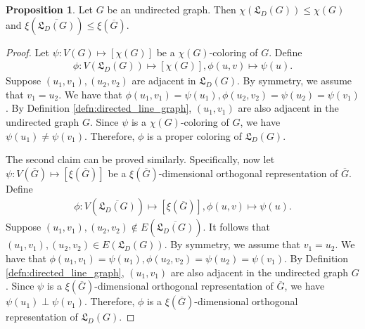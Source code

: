\documentclass[journal, onecolumn, draftcls]{IEEEtran}
\theoremstyle{definition}
\newtheorem{proposition}{Proposition}
\newcommand{\frL}{\mathfrak{L}}
\newcommand{\aditya}[1]{\marginpar{+}{\bf Aditya's remark}: {\em #1}}
\begin{document}
\begin{proposition}\label{prop:chi_and_xi_of_line_graph}
    Let $G$ be an undirected graph. Then $\chi(\frL_D(G) )\le \chi(G)$ and $\xi(\overline{\frL_D(G)}) \le \xi(\overline{G})$. 
\end{proposition}
\begin{proof}
Let $\psi:V(G) \mapsto [\chi(G)]$ be a $\chi(G)$-coloring of $G$. Define
\begin{align*}
    \phi:V(\frL_D(G)) \mapsto [\chi(G)], \phi(u,v) \mapsto \psi(u).
\end{align*}
Suppose $(u_1,v_1),(u_2,v_2)$ are adjacent in $\frL_D(G)$. By symmetry, we assume that $v_1 = u_2$. We have that $\phi(u_1,v_1)=\psi(u_1),\phi(u_2,v_2)=\psi(u_2)=\psi(v_1)$. 
By Definition \ref{defn:directed_line_graph}, $(u_1,v_1)$ are also adjacent in the undirected graph $G$. Since $\psi$ is a $\chi(G)$-coloring of $G$, we have $\psi(u_1)\ne \psi(v_1)$. Therefore, $\phi$ is a proper coloring of $\frL_D(G)$.

The second claim can be proved similarly. Specifically, now let $\psi:V(\overline{G}) \mapsto [\xi(\overline{G})]$ be a $\xi(\overline{G})$-dimensional orthogonal representation of $\overline{G}$. Define
\begin{align*}
    \phi:V(\overline{\frL_D(G)}) \mapsto [\xi(\overline{G})], \phi(u,v) \mapsto \psi(u).
\end{align*}
Suppose $(u_1,v_1),(u_2,v_2)\notin E(\overline{\frL_D(G)})$. It follows that $(u_1,v_1),(u_2,v_2)\in E(\frL_D(G))$. By symmetry, we assume that $v_1 = u_2$. We have that $\phi(u_1,v_1)=\psi(u_1),\phi(u_2,v_2)=\psi(u_2)=\psi(v_1)$. 
By Definition \ref{defn:directed_line_graph}, $(u_1,v_1)$ are also adjacent in the undirected graph $G$. Since $\psi$ is a $\xi(\overline{G})$-dimensional orthogonal representation of $\overline{G}$, we have $\psi(u_1)\perp \psi(v_1)$. Therefore, $\phi$ is a $\xi(\overline{G})$-dimensional orthogonal representation of $\frL_D(G)$.
\end{proof}
\end{document}
